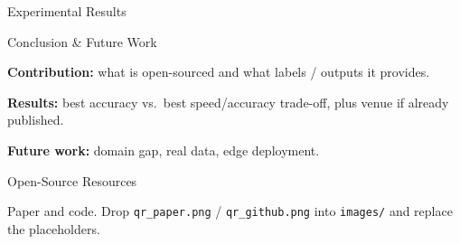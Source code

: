 \documentclass[final]{beamer}
\begin{document}
\begin{frame}[t]
\begin{columns}[t]
\begin{column}{\colwidth}
\begin{block}{Experimental Results}
  \end{block}

  \begin{block}{Conclusion \& Future Work}

  \textbf{Contribution:} what is open-sourced and what labels / outputs it provides.

  \textbf{Results:} best accuracy vs.\ best speed/accuracy trade-off, plus venue if already published.

  \textbf{Future work:} domain gap, real data, edge deployment.

  \end{block}

  \begin{block}{Open-Source Resources}

  Paper and code. Drop \texttt{qr\_paper.png} / \texttt{qr\_github.png} into \texttt{images/} and replace the placeholders.

  \vspace{0.5em}

  \begin{minipage}[t]{0.48\textwidth}
    \centering

    \textbf{\PaperLabel}
  \end{minipage}\hfill
  \begin{minipage}[t]{0.48\textwidth}
    \centering

    \textbf{\CodeLabel}
  \end{minipage}

  \end{block}

\end{column}
\separatorcolumn

\end{columns}
\end{frame}
\end{document}
